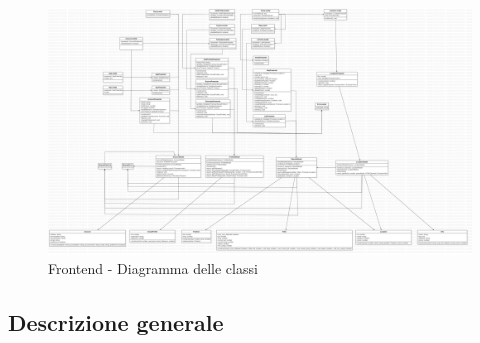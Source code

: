 \begin{figure}[!h]
    \includegraphics[width=16cm]{sezioni/images/Main.jpg}
    \centering
    \caption{Frontend - Diagramma delle classi}
\end{figure}

\subsection{Descrizione generale}
